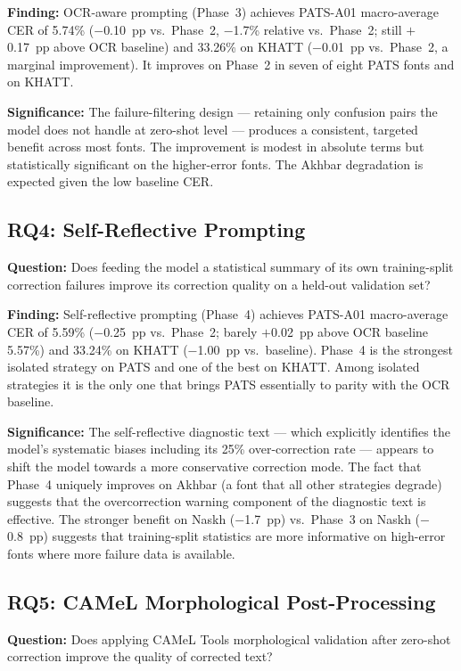 \textbf{Finding:} OCR-aware prompting (Phase~3) achieves PATS-A01
macro-average CER of 5.74\% ($-$0.10~pp vs.\ Phase~2, $-$1.7\% relative
vs.\ Phase~2; still $+$0.17~pp above OCR baseline)
and 33.26\% on KHATT ($-$0.01~pp vs.\ Phase~2, a marginal improvement).
It improves on Phase~2 in seven of eight PATS fonts and on KHATT.

\textbf{Significance:} The failure-filtering design --- retaining only
confusion pairs the model does not handle at zero-shot level --- produces a
consistent, targeted benefit across most fonts. The improvement is modest in
absolute terms but statistically significant on the higher-error fonts. The
Akhbar degradation is expected given the low baseline CER.

\subsection*{RQ4: Self-Reflective Prompting}

\textbf{Question:} Does feeding the model a statistical summary of its own
training-split correction failures improve its correction quality on a
held-out validation set?

\textbf{Finding:} Self-reflective prompting (Phase~4) achieves PATS-A01
macro-average CER of 5.59\% ($-$0.25~pp vs.\ Phase~2; barely $+$0.02~pp
above OCR baseline 5.57\%) and 33.24\% on KHATT ($-$1.00~pp vs.\ baseline).
Phase~4 is the strongest isolated strategy on PATS and one of the best on KHATT.
Among isolated strategies it is the only one that brings PATS essentially to
parity with the OCR baseline.

\textbf{Significance:} The self-reflective diagnostic text --- which
explicitly identifies the model's systematic biases including its 25\%
over-correction rate --- appears to shift the model towards a more
conservative correction mode. The fact that Phase~4 uniquely improves on
Akhbar (a font that all other strategies degrade) suggests that the
overcorrection warning component of the diagnostic text is effective.
The stronger benefit on Naskh ($-$1.7~pp) vs.\ Phase~3 on Naskh ($-$0.8~pp)
suggests that training-split statistics are more informative on high-error
fonts where more failure data is available.

\subsection*{RQ5: CAMeL Morphological Post-Processing}

\textbf{Question:} Does applying CAMeL Tools morphological validation after
zero-shot correction improve the quality of corrected text?

